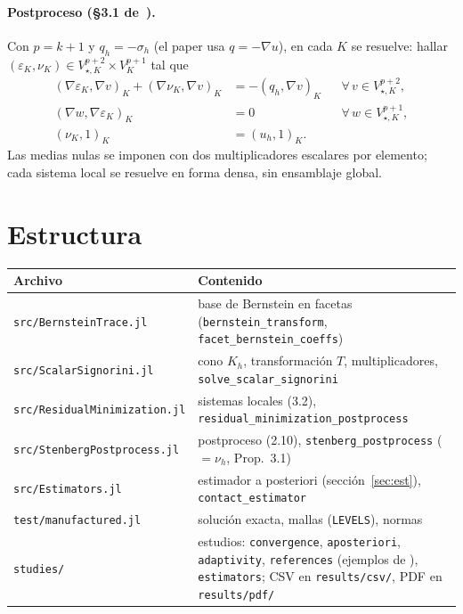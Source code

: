 \documentclass[11pt,a4paper]{article}
\newcommand{\code}[1]{\texttt{#1}}
\begin{document}
\paragraph{Postproceso (§3.1 de~\cite{muga}).} Con $p=k+1$ y $q_h=-\sigma_h$ (el paper usa
$q=-\nabla u$), en cada $K$ se resuelve: hallar
$(\varepsilon_K,\nu_K)\in V^{p+2}_{\star,K}\times V^{p+1}_K$ tal que
\begin{align*}
  (\nabla\varepsilon_K,\nabla v)_K+(\nabla\nu_K,\nabla v)_K &= -(q_h,\nabla v)_K && \forall\,v\in V^{p+2}_{\star,K},\\
  (\nabla w,\nabla\varepsilon_K)_K &= 0 && \forall\,w\in V^{p+1}_{\star,K},\\
  (\nu_K,1)_K &= (u_h,1)_K .
\end{align*}
Las medias nulas se imponen con dos multiplicadores escalares por elemento; cada sistema local
se resuelve en forma densa, sin ensamblaje global.

\section{Estructura}

\noindent
\begin{tabularx}{\linewidth}{@{}l>{\raggedright\arraybackslash}X@{}}
\toprule
Archivo & Contenido \\
\midrule
\code{src/BernsteinTrace.jl}       & base de Bernstein en facetas (\code{bernstein\_transform}, \code{facet\_bernstein\_coeffs}) \\
\code{src/ScalarSignorini.jl}      & cono $K_h$, transformación $T$, multiplicadores, \code{solve\_scalar\_signorini} \\
\code{src/ResidualMinimization.jl} & sistemas locales (3.2), \code{residual\_minimization\_postprocess} \\
\code{src/StenbergPostprocess.jl}  & postproceso (2.10), \code{stenberg\_postprocess} ($=\nu_h$, Prop.~3.1) \\
\code{src/Estimators.jl}           & estimador a posteriori (sección~\ref{sec:est}), \code{contact\_estimator} \\
\code{test/manufactured.jl}        & solución exacta, mallas (\code{LEVELS}), normas \\
\code{studies/}                    & estudios: \code{convergence}, \code{aposteriori}, \code{adaptivity},
                                     \code{references} (ejemplos de \cite{fhs,bgk}), \code{estimators};
                                     CSV en \code{results/csv/}, PDF en \code{results/pdf/} \\
\bottomrule
\end{tabularx}
\end{document}
